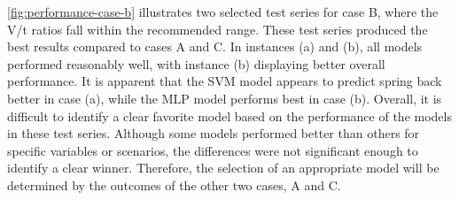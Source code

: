 \cref{fig:performance-case-b} illustrates two selected test series for case B, where the V/t ratios fall within
the recommended range.
These test series produced the best results compared to cases A and C.
In instances (a) and (b), all models performed reasonably well, with instance (b) displaying better overall
performance.
It is apparent that the SVM model appears to predict spring back better in case (a), while the MLP model performs
best in case (b).
Overall, it is difficult to identify a clear favorite model based on the performance of the models in these test
series.
Although some models performed better than others for specific variables or scenarios, the differences were
not significant enough to identify a clear winner.
Therefore, the selection of an appropriate model will be determined by the outcomes of the other two cases, A and C.

